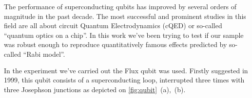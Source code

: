 \documentclass[a0, portrait]{a0poster}
\begin{document}
\vspace{-1.5cm}
\begin{multicols}{2}							%


\begin{tcolorbox}[left=1cm, right=1cm, top=0.5cm, bottom=0.5cm, 
                  title={\Large Introduction}, bottomtitle=.5cm,toptitle=.5cm]
\begingroup
\setlength{\columnsep}{1cm}	
\begin{multicols}{2}
The performance of superconducting qubits has improved by several orders of magnitude in the past decade. The most successful and prominent studies\cite{bishop2009} in this field are all about circuit Quantum Electrodynamics (cQED) or so-called ``quantum optics on a chip''. In this work we've been trying to test if our sample was robust enough to reproduce quantitatively famous effects predicted by so-called ``Rabi model''.
\end{multicols}
\endgroup
\end{tcolorbox}

\begin{tcolorbox}[left=1cm, right=1cm, top=0.5cm, bottom=0.5cm, 
                  title={\Large Flux qubit}, bottomtitle=.3cm, toptitle=.5cm
                  ]

In the experiment we've carried out the Flux qubit was used. Firstly suggested in 1999, this qubit consists of a superconducting loop, interrupted three times with three Josephson junctions as depicted on \autoref{fig:qubit}~(a),~(b).\\


\end{tcolorbox}
\end{multicols}
\end{document}
